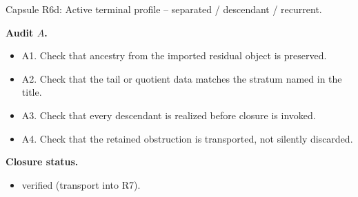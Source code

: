 \documentclass[11pt]{amsart}
\newcommand{\capsulefield}[1]{\par\smallskip\noindent\textbf{#1.}\ }
\begin{document}
\begin{proofcapsule}{Capsule R6d: Active terminal profile -- separated / descendant / recurrent.}
  \capsulefield{Audit \(A\)}
  \begin{itemize}[leftmargin=1.8em]
  \item A1. Check that ancestry from the imported residual object is preserved.
  \item A2. Check that the tail or quotient data matches the stratum named in the title.
  \item A3. Check that every descendant is realized before closure is invoked.
  \item A4. Check that the retained obstruction is transported, not silently discarded.
  \end{itemize}
  \capsulefield{Closure status}
  \begin{itemize}[leftmargin=1.8em]
  \item verified (transport into R7).
  \end{itemize}
\end{proofcapsule}
\end{document}

